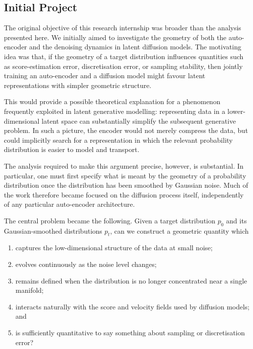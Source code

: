 \documentclass{article}
\theoremstyle{plain}
\theoremstyle{definition}
\theoremstyle{remark}
\begin{document}
\subsection{Initial Project}
\label{subsec:initial-project}

The original objective of this research internship was broader than the analysis presented here. We initially aimed to investigate the geometry of both the auto-encoder and the denoising dynamics in latent diffusion models. The motivating idea was that, if the geometry of a target distribution influences quantities such as score-estimation error, discretisation error, or sampling stability, then jointly training an auto-encoder and a diffusion model might favour latent representations with simpler geometric structure.

This would provide a possible theoretical explanation for a phenomenon frequently exploited in latent generative modelling: representing data in a lower-dimensional latent space can substantially simplify the subsequent generative problem. In such a picture, the encoder would not merely compress the data, but could implicitly search for a representation in which the relevant probability distribution is easier to model and transport.

The analysis required to make this argument precise, however, is substantial. In particular, one must first specify what is meant by the geometry of a probability distribution once the distribution has been smoothed by Gaussian noise. Much of the work therefore became focused on the diffusion process itself, independently of any particular auto-encoder architecture.

The central problem became the following. Given a target distribution $p_0$ and its Gaussian-smoothed distributions $p_t$, can we construct a geometric quantity which

\begin{enumerate}
\item captures the low-dimensional structure of the data at small noise;
\item evolves continuously as the noise level changes;
\item remains defined when the distribution is no longer concentrated near a single manifold;
\item interacts naturally with the score and velocity fields used by diffusion models; and
\item is sufficiently quantitative to say something about sampling or discretisation error?
\end{enumerate}
\end{document}
